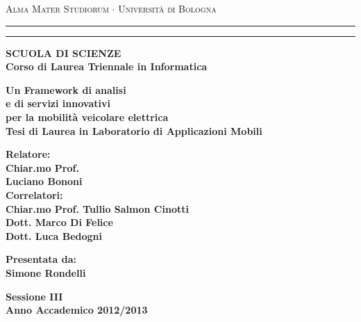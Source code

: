   \begin{titlepage}
    \begin{center}
      {{\Large{\textsc{Alma Mater Studiorum $\cdot$ Universit\`a di Bologna}}}} \rule[0.1cm]{15.8cm}{0.1mm}
      \rule[0.5cm]{15.8cm}{0.6mm}
      {\small{\bf SCUOLA DI SCIENZE\\
      Corso di Laurea Triennale in Informatica }}
    \end{center}
    
    \vspace{15mm}
    
    \begin{center}
      {\LARGE{\bf Un Framework di analisi}}\\
      \vspace{3mm}
      {\LARGE{\bf e di servizi innovativi}}\\
	  \vspace{3mm}
      {\LARGE{\bf per la mobilità veicolare elettrica}}\\
      \vspace{15mm} 
      {\large{\bf Tesi di Laurea in Laboratorio di Applicazioni Mobili}}
    \end{center}
    
    \vspace{20mm}
    \par
    \noindent
    
    \begin{minipage}[t]{0.60\textwidth}
      {\large{\bf Relatore:\\
      Chiar.mo Prof.\\
      Luciano Bononi\newline}}\\
	{\large{\bf Correlatori:\\
	Chiar.mo Prof. Tullio Salmon Cinotti\\
	Dott. Marco Di Felice\\
	Dott. Luca Bedogni}}
    \end{minipage}
      \hfill
    \begin{minipage}[t]{0.34\textwidth}\raggedleft
    {\large{\bf Presentata da:\\
    Simone Rondelli}}  
    \end{minipage}
   \vspace{18mm}
    \begin{center}
	{\large{\bf Sessione III\\
	Anno Accademico 2012/2013}}
	\end{center}
	\clearpage{\pagestyle{empty}\cleardoublepage}%
  \end{titlepage}
  
\begin{abstract}
    Abstract \LaTeX.
    
    Abbiamo la testa rotonda 
	per pensare in tutte le direzioni. 
 
	Francis Picabia - (1922) 
\end{abstract}